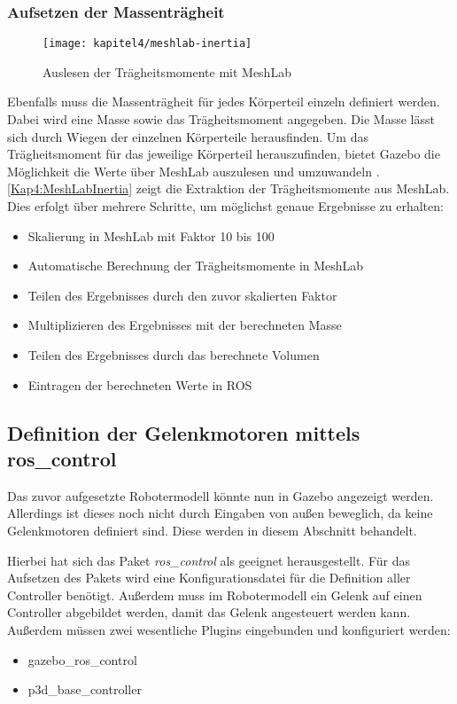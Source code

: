 \begin{itemize}
\subsubsection{Aufsetzen der Massenträgheit}

\begin{figure}[b!]
  \centering
  \texttt{[image: kapitel4/meshlab-inertia]}
  \caption{Auslesen der Trägheitsmomente mit MeshLab}
  \label{Kap4:MeshLabInertia}
\end{figure}

Ebenfalls muss die Massenträgheit für jedes Körperteil einzeln definiert werden. Dabei wird eine Masse sowie das Trägheitsmoment angegeben. Die Masse lässt sich durch Wiegen der einzelnen Körperteile herausfinden. Um das Trägheitsmoment für das jeweilige Körperteil herauszufinden, bietet Gazebo die Möglichkeit die Werte über MeshLab auszulesen und umzuwandeln \autocite{gazebo-inertial}. \autoref{Kap4:MeshLabInertia} zeigt die Extraktion der Trägheitsmomente aus MeshLab. Dies erfolgt über mehrere Schritte, um möglichst genaue Ergebnisse zu erhalten:
\begin{itemize}
  \item Skalierung in MeshLab mit Faktor 10 bis 100
  \item Automatische Berechnung der Trägheitsmomente in MeshLab
  \item Teilen des Ergebnisses durch den zuvor skalierten Faktor
  \item Multiplizieren des Ergebnisses mit der berechneten Masse
  \item Teilen des Ergebnisses durch das berechnete Volumen
  \item Eintragen der berechneten Werte in \ac{ROS}
\end{itemize}

\subsection{Definition der Gelenkmotoren mittels ros\_control}

Das zuvor aufgesetzte Robotermodell könnte nun in Gazebo angezeigt werden. Allerdings ist dieses noch nicht durch Eingaben von außen beweglich, da keine Gelenkmotoren definiert sind. Diese werden in diesem Abschnitt behandelt.

Hierbei hat sich das Paket \emph{ros\_control} als geeignet herausgestellt. Für das Aufsetzen des Pakets wird eine Konfigurationsdatei für die Definition aller Controller benötigt. Außerdem muss im Robotermodell ein Gelenk auf einen Controller abgebildet werden, damit das Gelenk angesteuert werden kann. Außerdem müssen zwei wesentliche Plugins eingebunden und konfiguriert werden:
\begin{itemize}
  \item gazebo\_ros\_control
  \item p3d\_base\_controller
\end{itemize}


\end{itemize}
